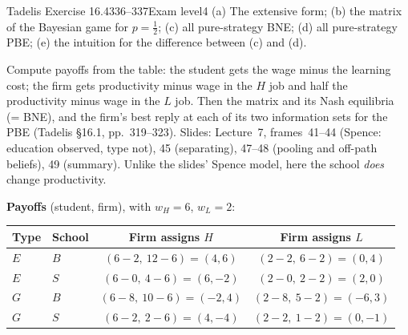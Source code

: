\begin{exsol}{Tadelis Exercise 16.4}{336--337}{Exam level}{4}
\asked (a) The extensive form; (b) the matrix of the Bayesian game for $p = \frac12$; (c) all pure-strategy BNE;
(d) all pure-strategy PBE; (e) the intuition for the difference between (c) and (d).

\method Compute payoffs from the table: the student gets the wage minus the learning cost; the firm gets
productivity minus wage in the $H$ job and half the productivity minus wage in the $L$ job. Then the matrix
and its Nash equilibria (= BNE), and the firm's best reply at each of its two information sets for the PBE
(Tadelis \S16.1, pp.~319--323). Slides: Lecture~7, frames~41--44 (Spence: education observed, type not),
45 (separating), 47--48 (pooling and off-path beliefs), 49 (summary). Unlike the slides' Spence model, here
the school \emph{does} change productivity.

\solution
\textbf{Payoffs} (student, firm), with $w_H = 6$, $w_L = 2$:
\begin{center}
\begin{tabular}{llcc}
\toprule
Type & School & Firm assigns $H$ & Firm assigns $L$ \\
\midrule
$E$ & $B$ & $(6 - 2,\ 12 - 6) = (4, 6)$ & $(2 - 2,\ 6 - 2) = (0, 4)$ \\
$E$ & $S$ & $(6 - 0,\ 4 - 6) = (6, -2)$ & $(2 - 0,\ 2 - 2) = (2, 0)$ \\
$G$ & $B$ & $(6 - 8,\ 10 - 6) = (-2, 4)$ & $(2 - 8,\ 5 - 2) = (-6, 3)$ \\
$G$ & $S$ & $(6 - 2,\ 2 - 6) = (4, -4)$ & $(2 - 2,\ 1 - 2) = (0, -1)$ \\
\bottomrule
\end{tabular}
\end{center}


\end{exsol}

